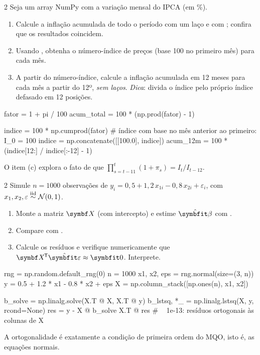 \documentclass[lista]{tmlnotas}
\begin{document}
\begin{exercicio}{2}
Seja  um array NumPy com a variação mensal do IPCA (em \%).
\begin{enumerate}[label=(\alph*)]
  \item Calcule a inflação acumulada de todo o período com um laço e com
        ; confira que os resultados coincidem.
  \item Usando , obtenha o número-índice de preços (base 100
        no primeiro mês) para cada mês.
  \item A partir do número-índice, calcule a inflação acumulada em 12 meses
        para cada mês a partir do 12º, \emph{sem laços}.
        \emph{Dica}: divida o índice pelo próprio índice defasado em 12 posições.
\end{enumerate}
\end{exercicio}
\begin{solucao}
\begin{codigo}
fator = 1 + pi / 100
acum_total = 100 * (np.prod(fator) - 1)

indice = 100 * np.cumprod(fator)
# índice com base no mês anterior ao primeiro: I_0 = 100
indice = np.concatenate([[100.0], indice])
acum_12m = 100 * (indice[12:] / indice[:-12] - 1)
\end{codigo}
O item (c) explora o fato de que $\prod_{s=t-11}^{t}(1+\pi_s) = I_t / I_{t-12}$.
\end{solucao}

\begin{exercicio}{2}
Simule $n = 1000$ observações de $y_i = 0{,}5 + 1{,}2\,x_{1i} - 0{,}8\,x_{2i} +
\varepsilon_i$, com $x_{1}, x_{2}, \varepsilon \overset{\text{iid}}{\sim} \mathcal{N}(0,1)$.
\begin{enumerate}[label=(\alph*)]
  \item Monte a matriz $\mX$ (com intercepto) e estime $\hvbeta$ com
        .
  \item Compare com .
  \item Calcule os resíduos e verifique numericamente que $\mX\T\hat{\ve}
        \approx \vect{0}$. Interprete.
\end{enumerate}
\end{exercicio}
\begin{solucao}
\begin{codigo}
rng = np.random.default_rng(0)
n = 1000
x1, x2, eps = rng.normal(size=(3, n))
y = 0.5 + 1.2 * x1 - 0.8 * x2 + eps
X = np.column_stack([np.ones(n), x1, x2])

b_solve = np.linalg.solve(X.T @ X, X.T @ y)
b_lstsq, *_ = np.linalg.lstsq(X, y, rcond=None)
res = y - X @ b_solve
X.T @ res        # ~ 1e-13: resíduos ortogonais às colunas de X
\end{codigo}
A ortogonalidade é exatamente a condição de primeira ordem do MQO, isto é,
as equações normais.
\end{solucao}
\end{document}
